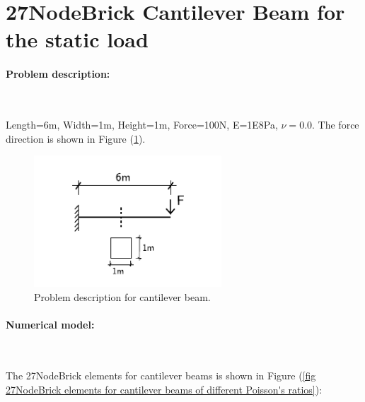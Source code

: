 \section{27NodeBrick Cantilever Beam for the static load}

\paragraph{Problem description: } ~

Length=6m, Width=1m, Height=1m, Force=100N, E=1E8Pa, $\nu=0.0$.
The force direction is shown in Figure (\ref{fig Problem description for cantilever beams of different Poisson's 27}). 

\begin{figure}[!htb]
  \centering
  \includegraphics[width=7cm]{./Figure-files/_Chapter_Appendix_Illustrative_Examples/cantilever_6.pdf}
  \caption{Problem description for cantilever beam.}
  \label{fig Problem description for cantilever beams of different Poisson's 27}
\end{figure}

\paragraph{Numerical model:} ~

The  27NodeBrick  elements  for  cantilever  beams  is shown in Figure (\ref{fig 27NodeBrick elements for cantilever beams of different Poisson's ratios}):

